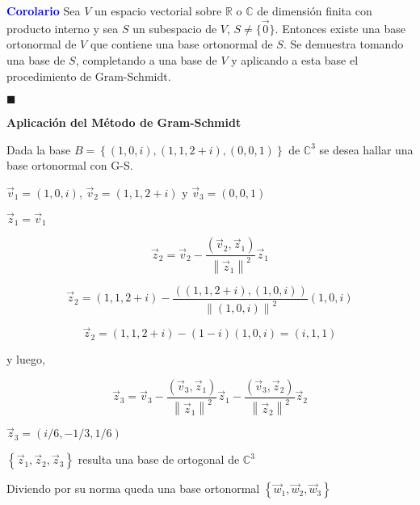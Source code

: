 \textcolor{blue}{\textbf{Corolario}}
Sea $V$ un espacio vectorial sobre $\mathbb{R}$ o $\mathbb{C}$ de dimensión finita con producto interno y sea $S$ un subespacio   de $V$, $S\neq \{\vec{0}\}$. Entonces existe una base ortonormal de $V$ que contiene una base ortonormal de $S$.
Se demuestra tomando una base de $S$, completando a una base de $V$ y aplicando a esta base el procedimiento de Gram-Schmidt.
{\hfill{\tiny\ensuremath{\blacksquare}}

\bigskip

\bigskip

%



\begin{example} \textbf{Aplicación del  Método de Gram-Schmidt}

\bigskip

Dada la base $B= \left\{(1,0,i),(1,1,2+i),(0,0,1)\right\}$ de $\mathbb{C}^{3}$ se desea hallar una base ortonormal con G-S.

\bigskip

$\vec{v}_1= (1,0,i)  $, $\vec{v}_2= (1,1,2+i)$    y $\vec{v}_3=(0,0,1)$ 

\bigskip






$\vec{z}_{1}= \vec{v}_{1}$



\[
 \vec{z}_{2}= \vec{v}_{2} -\frac {(\vec{v}_2, \vec{z}_1)} {\left\|\vec{z}_1\right\|^{2}} \vec{z}_1 
\]



\[\vec{z}_{2}= (1,1,2+i) -\frac {((1,1,2+i), (1,0,i))} {\left\|(1,0,i)\right\|^{2}} (1,0,i)
\]


\[\vec{z}_{2}= (1,1,2+i) -(1-i) (1,0,i)=(i,1,1)
\]


y luego, 




\[ \vec{z}_{3}= \vec{v}_{3} - \frac {(\vec{v}_{3}, \vec{z}_1)} {\left\|\vec{z}_1\right\|^{2}} \vec{z}_1 - \frac {(\vec{v}_{3}, \vec{z}_2)} {\left\|\vec{z}_2\right\|^{2}} \vec{z}_2 
\]
\bigskip


$ \vec{z}_{3}=(i/6,-1/3,1/6)$

\bigskip

$\left\{\vec{z}_1,\vec{z}_2, \vec{z}_3\right\}$ resulta una base de ortogonal de $\mathbb{C}^{3}$ 

\bigskip

Diviendo por su norma queda una base ortonormal $\left\{\vec{w}_1,\vec{w}_2, \vec{w}_3\right\}$


\end{example}}
